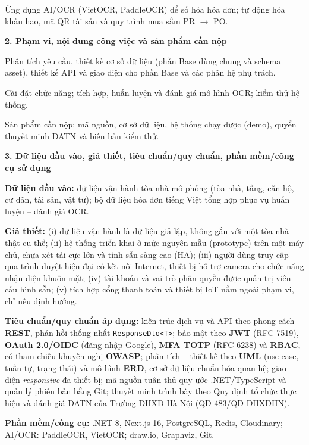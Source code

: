 \textbullet{}  Ứng dụng AI/OCR (VietOCR, PaddleOCR) để số hóa hóa đơn; tự động hóa khấu hao, mã QR tài sản và quy trình mua sắm PR $\rightarrow$ PO.

\textbf{2. Phạm vi, nội dung công việc và sản phẩm cần nộp}

\textbullet{}  Phân tích yêu cầu, thiết kế cơ sở dữ liệu (phần Base dùng chung và schema asset), thiết kế API và giao diện cho phần Base và các phân hệ phụ trách.

\textbullet{}  Cài đặt chức năng; tích hợp, huấn luyện và đánh giá mô hình OCR; kiểm thử hệ thống.

\textbullet{}  Sản phẩm cần nộp: mã nguồn, cơ sở dữ liệu, hệ thống chạy được (demo), quyển thuyết minh ĐATN và biên bản kiểm thử.

\textbf{3. Dữ liệu đầu vào, giả thiết, tiêu chuẩn/quy chuẩn, phần mềm/công cụ sử dụng}

\textbullet{}  \textbf{Dữ liệu đầu vào:} dữ liệu vận hành tòa nhà mô phỏng (tòa nhà, tầng, căn hộ, cư dân, tài sản, vật tư); bộ dữ liệu hóa đơn tiếng Việt tổng hợp phục vụ huấn luyện – đánh giá OCR.

\textbullet{}  \textbf{Giả thiết:} (i) dữ liệu vận hành là dữ liệu giả lập, không gắn với một tòa nhà thật cụ thể; (ii) hệ thống triển khai ở mức nguyên mẫu (prototype) trên một máy chủ, chưa xét tải cực lớn và tính sẵn sàng cao (HA); (iii) người dùng truy cập qua trình duyệt hiện đại có kết nối Internet, thiết bị hỗ trợ camera cho chức năng nhận diện khuôn mặt; (iv) tài khoản và vai trò phân quyền được quản trị viên cấu hình sẵn; (v) tích hợp cổng thanh toán và thiết bị IoT nằm ngoài phạm vi, chỉ nêu định hướng.

\textbullet{}  \textbf{Tiêu chuẩn/quy chuẩn áp dụng:} kiến trúc dịch vụ và API theo phong cách \textbf{REST}, phản hồi thống nhất \texttt{ResponseDto<T>}; bảo mật theo \textbf{JWT} (RFC 7519), \textbf{OAuth 2.0/OIDC} (đăng nhập Google), \textbf{MFA TOTP} (RFC 6238) và \textbf{RBAC}, có tham chiếu khuyến nghị \textbf{OWASP}; phân tích – thiết kế theo \textbf{UML} (use case, tuần tự, trạng thái) và mô hình \textbf{ERD}, cơ sở dữ liệu chuẩn hóa quan hệ; giao diện \emph{responsive} đa thiết bị; mã nguồn tuân thủ quy ước .NET/TypeScript và quản lý phiên bản bằng Git; thuyết minh trình bày theo Quy định tổ chức thực hiện và đánh giá ĐATN của Trường ĐHXD Hà Nội (QĐ 483/QĐ-ĐHXDHN).

\textbullet{}  \textbf{Phần mềm/công cụ:} .NET 8, Next.js 16, PostgreSQL, Redis, Cloudinary; AI/OCR: PaddleOCR, VietOCR; draw.io, Graphviz, Git.

